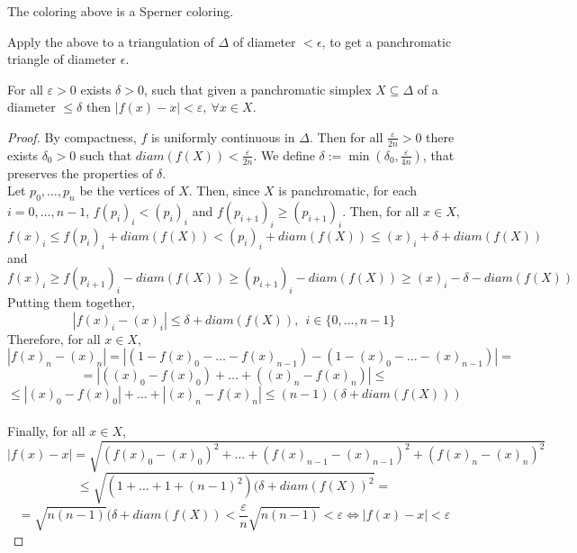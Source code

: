 \begin{lemma}
\label{induced_colouring_is_sperner_colouring}
The coloring above is a Sperner coloring.
\end{lemma}

Apply the above to a triangulation of $\Delta$ of diameter $<\epsilon$, to get a panchromatic triangle of diameter $\epsilon$.

\begin{lemma}
\label{small_panchromatic_simplex_has_almost_fixed_point}
For all $\varepsilon>0$ exists $\delta>0$, such that given a panchromatic simplex $X\subseteq \Delta$ of a diameter $\leq \delta$ then $|f(x) - x| < \varepsilon,\ \forall x \in X$.
\end{lemma}
\begin{proof}
By compactness, $f$ is uniformly continuous in $\Delta$. Then for all $\frac{\varepsilon}{2n}>0$ there exists $\delta_0>0$ such that  $diam(f(X)) < \frac{\varepsilon}{2n}$. We define $\delta:=\min(\delta_0,\frac{\varepsilon}{4n})$, that preserves the properties of $\delta$.\\
Let $p_0, \ldots, p_n$ be the vertices of $X$. Then, since $X$ is panchromatic, for each $i = 0,\ldots,n-1$, $f(p_i)_i < (p_i)_i$ and $f(p_{i+1})_i \geq (p_{i+1})_i$.
Then, for all $x \in X$,
$$f(x)_i \leq f(p_i)_i + diam(f(X)) < (p_i)_i + diam(f(X)) \leq (x)_i + \delta + diam(f(X))$$ and $$f(x)_i \geq f(p_{i+1})_i - diam(f(X)) \geq (p_{i+1})_i - diam(f(X)) \geq (x)_i - \delta - diam(f(X))$$
Putting them together,
$$|f(x)_i - (x)_i| \leq \delta + diam(f(X)),\ \ i\in\{0,...,n-1\}$$ 
Therefore, for all $x \in X$,
$$|f(x)_n - (x)_n| = |(1 - f(x)_0 - \ldots - f(x)_{n-1}) - (1 - (x)_0 - \ldots - (x)_{n-1})| = $$
$$ = |((x)_0 - f(x)_0) + \ldots + ((x)_n - f(x)_n)| \leq$$
$$\leq |(x)_0 - f(x)_0| + \ldots + |(x)_n - f(x)_n| \leq (n-1)(\delta + diam(f(X)))$$\\
Finally, for all $x \in X$,
$$|f(x) - x| = \sqrt{(f(x)_0 - (x)_0)^2 + \ldots + (f(x)_{n-1} - (x)_{n-1})^2 + (f(x)_n - (x)_n)^2}$$
$$\leq \sqrt{(1 + \ldots + 1 + (n - 1)^2)(\delta + diam(f(X))^2} = $$
$$ = \sqrt{n(n-1)}(\delta + diam(f(X)) < \frac{\varepsilon}{n}\sqrt{n(n-1)} < \varepsilon\Longleftrightarrow |f(x)-x|<\varepsilon$$
$ $
\end{proof}

